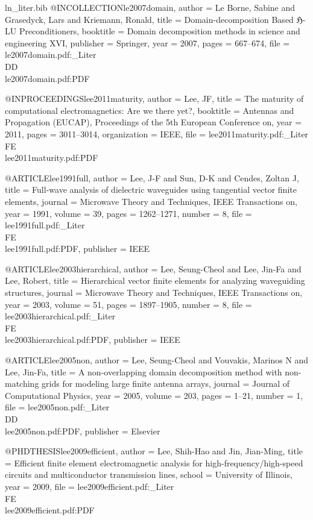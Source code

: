 \begin{filecontents*}{ln_liter.bib}
@INCOLLECTION{le2007domain,
  author = {Le Borne, Sabine and Grasedyck, Lars and Kriemann, Ronald},
  title = {Domain-decomposition Based ℌ-LU Preconditioners},
  booktitle = {Domain decomposition methods in science and engineering XVI},
  publisher = {Springer},
  year = {2007},
  pages = {667--674},
  file = {le2007domain.pdf:_Liter\\DD\\le2007domain.pdf:PDF}
}

@INPROCEEDINGS{lee2011maturity,
  author = {Lee, JF},
  title = {The maturity of computational electromagnetics: Are we there yet?},
  booktitle = {Antennas and Propagation (EUCAP), Proceedings of the 5th European
	Conference on},
  year = {2011},
  pages = {3011--3014},
  organization = {IEEE},
  file = {lee2011maturity.pdf:_Liter\\FE\\lee2011maturity.pdf:PDF}
}

@ARTICLE{lee1991full,
  author = {Lee, J-F and Sun, D-K and Cendes, Zoltan J},
  title = {Full-wave analysis of dielectric waveguides using tangential vector
	finite elements},
  journal = {Microwave Theory and Techniques, IEEE Transactions on},
  year = {1991},
  volume = {39},
  pages = {1262--1271},
  number = {8},
  file = {lee1991full.pdf:_Liter\\FE\\lee1991full.pdf:PDF},
  publisher = {IEEE}
}

@ARTICLE{lee2003hierarchical,
  author = {Lee, Seung-Cheol and Lee, Jin-Fa and Lee, Robert},
  title = {Hierarchical vector finite elements for analyzing waveguiding structures},
  journal = {Microwave Theory and Techniques, IEEE Transactions on},
  year = {2003},
  volume = {51},
  pages = {1897--1905},
  number = {8},
  file = {lee2003hierarchical.pdf:_Liter\\FE\\lee2003hierarchical.pdf:PDF},
  publisher = {IEEE}
}

@ARTICLE{lee2005non,
  author = {Lee, Seung-Cheol and Vouvakis, Marinos N and Lee, Jin-Fa},
  title = {A non-overlapping domain decomposition method with non-matching grids
	for modeling large finite antenna arrays},
  journal = {Journal of Computational Physics},
  year = {2005},
  volume = {203},
  pages = {1--21},
  number = {1},
  file = {lee2005non.pdf:_Liter\\DD\\lee2005non.pdf:PDF},
  publisher = {Elsevier}
}

@PHDTHESIS{lee2009efficient,
  author = {Lee, Shih-Hao and Jin, Jian-Ming},
  title = {Efficient finite element electromagnetic analysis for high-frequency/high-speed
	circuits and multiconductor transmission lines},
  school = {University of Illinois},
  year = {2009},
  file = {lee2009efficient.pdf:_Liter\\FE\\lee2009efficient.pdf:PDF}
}


\end{filecontents*}
